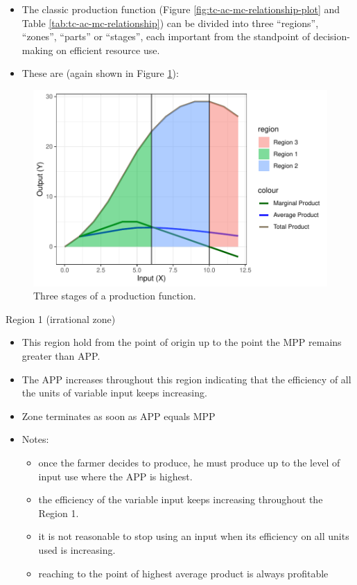 \documentclass[12pt,ignorenonframetext,aspectratio=169]{beamer}
\providecommand{\tightlist}{%
  \setlength{\itemsep}{0pt}\setlength{\parskip}{0pt}}
\begin{document}
\begin{frame}{}
\protect\hypertarget{section-14}{}
\begin{itemize}
\tightlist
\item
  The classic production function (Figure
  \ref{fig:tc-ac-mc-relationship-plot} and Table
  \ref{tab:tc-ac-mc-relationship}) can be divided into three
  ``regions'', ``zones'', ``parts'' or ``stages'', each important from
  the standpoint of decision-making on efficient resource use.
\item
  These are (again shown in Figure
  \ref{fig:production-function-stages}):
\end{itemize}

\begin{figure}
\includegraphics[width=0.7\linewidth]{production_relationship_files/figure-beamer/production-function-stages-1} \caption{Three stages of a production function.}\label{fig:production-function-stages}
\end{figure}
\end{frame}

\begin{frame}{Region 1 (irrational zone)}
\protect\hypertarget{region-1-irrational-zone}{}
\begin{itemize}
\tightlist
\item
  This region hold from the point of origin up to the point the MPP
  remains greater than APP.
\item
  The APP increases throughout this region indicating that the
  efficiency of all the units of variable input keeps increasing.
\item
  Zone terminates as soon as APP equals MPP
\item
  Notes:

  \begin{itemize}
  \tightlist
  \item
    once the farmer decides to produce, he must produce up to the level
    of input use where the APP is highest.
  \item
    the efficiency of the variable input keeps increasing throughout the
    Region 1.
  \item
    it is not reasonable to stop using an input when its efficiency on
    all units used is increasing.
  \item
    reaching to the point of highest average product is always
    profitable
  \end{itemize}
\end{itemize}
\end{frame}
\end{document}
